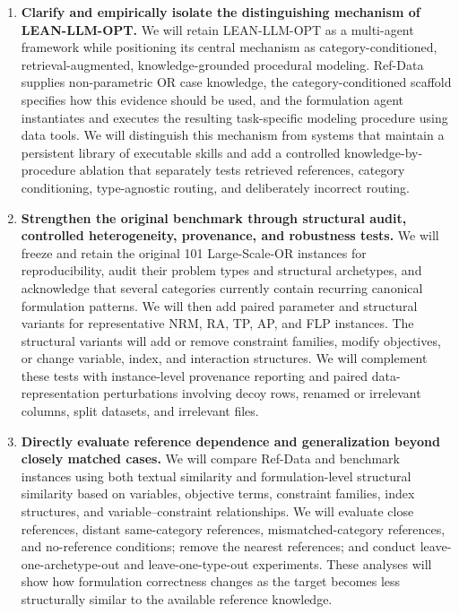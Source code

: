 \documentclass[11pt]{article}
\begin{document}
\begin{enumerate}
    \item \textbf{Clarify and empirically isolate the distinguishing mechanism
    of LEAN-LLM-OPT.}
    We will retain LEAN-LLM-OPT as a multi-agent framework while positioning
    its central mechanism as category-conditioned, retrieval-augmented,
    knowledge-grounded procedural modeling. Ref-Data supplies non-parametric
    OR case knowledge, the category-conditioned scaffold specifies how this
    evidence should be used, and the formulation agent instantiates and
    executes the resulting task-specific modeling procedure using data tools.
    We will distinguish this mechanism from systems that maintain a persistent
    library of executable skills and add a controlled knowledge-by-procedure
    ablation that separately tests retrieved references, category conditioning,
    type-agnostic routing, and deliberately incorrect routing.

    \item \textbf{Strengthen the original benchmark through structural audit,
    controlled heterogeneity, provenance, and robustness tests.}
    We will freeze and retain the original 101 Large-Scale-OR instances for
    reproducibility, audit their problem types and structural archetypes, and
    acknowledge that several categories currently contain recurring canonical
    formulation patterns. We will then add paired parameter and structural
    variants for representative NRM, RA, TP, AP, and FLP instances. The
    structural variants will add or remove constraint families, modify
    objectives, or change variable, index, and interaction structures. We will
    complement these tests with instance-level provenance reporting and paired
    data-representation perturbations involving decoy rows, renamed or
    irrelevant columns, split datasets, and irrelevant files.

    \item \textbf{Directly evaluate reference dependence and generalization
    beyond closely matched cases.}
    We will compare Ref-Data and benchmark instances using both textual
    similarity and formulation-level structural similarity based on variables,
    objective terms, constraint families, index structures, and
    variable--constraint relationships. We will evaluate close references,
    distant same-category references, mismatched-category references, and
    no-reference conditions; remove the nearest references; and conduct
    leave-one-archetype-out and leave-one-type-out experiments. These analyses
    will show how formulation correctness changes as the target becomes less
    structurally similar to the available reference knowledge.


\end{enumerate}
\end{document}

